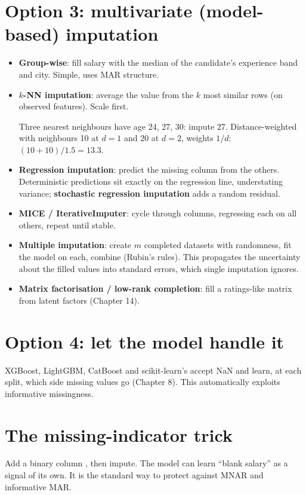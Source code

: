 \section{Option 3: multivariate (model-based) imputation}
\begin{itemize}
\item \textbf{Group-wise}: fill salary with the median of the candidate's experience band and city. Simple, uses MAR structure.
\item \textbf{$k$-NN imputation}: average the value from the $k$ most similar rows (on observed features). Scale first.
  \begin{example}
  Three nearest neighbours have age 24, 27, 30: impute 27. Distance-weighted with neighbours 10 at $d = 1$ and 20 at $d=2$, weights
  $1/d$: $(10 + 10)/1.5 = 13.3$.
  \end{example}
\item \textbf{Regression imputation}: predict the missing column from the others. Deterministic predictions sit exactly on the
  regression line, understating variance; \textbf{stochastic regression imputation} adds a random residual.
\item \textbf{MICE / IterativeImputer}: cycle through columns, regressing each on all others, repeat until stable.
\item \textbf{Multiple imputation}: create $m$ completed datasets with randomness, fit the model on each, combine (Rubin's rules).
  This propagates the uncertainty about the filled values into standard errors, which single imputation ignores.
\item \textbf{Matrix factorisation / low-rank completion}: fill a ratings-like matrix from latent factors (Chapter 14).
\end{itemize}

\section{Option 4: let the model handle it}
XGBoost, LightGBM, CatBoost and scikit-learn's  accept NaN and learn, at each split, which side missing
values go (Chapter 8). This automatically exploits informative missingness.

\section{The missing-indicator trick}
Add a binary column , then impute. The model can learn ``blank salary'' as a signal of its own. It is the
standard way to protect against MNAR and informative MAR.

